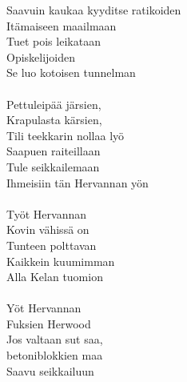
Saavuin kaukaa kyyditse ratikoiden \\
Itämaiseen maailmaan \\
Tuet pois leikataan \\
Opiskelijoiden \\
Se luo kotoisen tunnelman \\
\hspace{10mm}\\
Pettuleipää järsien, \\
Krapulasta kärsien, \\
Tili teekkarin nollaa lyö \\
Saapuen raiteillaan \\
Tule seikkailemaan \\
Ihmeisiin tän Hervannan yön \\
\hspace{10mm}\\
Työt Hervannan \\
Kovin vähissä on \\
Tunteen polttavan \\
Kaikkein kuumimman \\
Alla Kelan tuomion \\
\hspace{10mm}\\
Yöt Hervannan \\
Fuksien Herwood \\
Jos valtaan sut saa, \\
betoniblokkien maa \\
Saavu seikkailuun \\